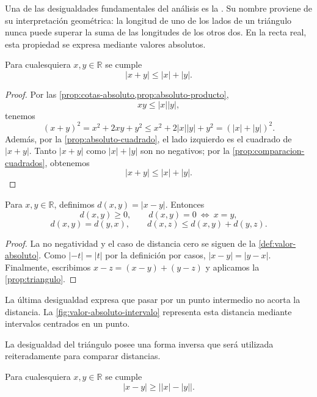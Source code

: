 Una de las desigualdades fundamentales del análisis es la . Su nombre proviene de su interpretación geométrica: la longitud de uno de los lados de un triángulo nunca puede superar la suma de las longitudes de los otros dos. En la recta real, esta propiedad se expresa mediante valores absolutos.

\begin{samepage}
\begin{proposition}
\label{prop:triangulo}
Para cualesquiera $x,y\in\mathbb{R}$ se cumple
\[
|x+y|\leq |x|+|y|.
\]
\end{proposition}
\end{samepage}

\begin{proof}
Por las \cref{prop:cotas-absoluto,prop:absoluto-producto},
\[
xy\leq |x||y|,
\]
tenemos
\[
(x+y)^2=x^2+2xy+y^2
\leq x^2+2|x||y|+y^2
=(|x|+|y|)^2.
\]
Además, por la \cref{prop:absoluto-cuadrado}, el lado izquierdo es el cuadrado de $|x+y|$. Tanto $|x+y|$ como $|x|+|y|$ son no negativos; por la \cref{prop:comparacion-cuadrados}, obtenemos
\[
|x+y|\leq|x|+|y|.
\]
\end{proof}

\begin{samepage}
\begin{proposition}
\label{prop:distancia-real}
Para $x,y\in\mathbb{R}$, definimos $d(x,y)=|x-y|$. Entonces
\[
d(x,y)\geq0,\qquad d(x,y)=0\ \Longleftrightarrow\ x=y,
\]
\[
d(x,y)=d(y,x),\qquad d(x,z)\leq d(x,y)+d(y,z).
\]
\end{proposition}
\end{samepage}

\begin{proof}
La no negatividad y el caso de distancia cero se siguen de la \cref{def:valor-absoluto}. Como $|-t|=|t|$ por la definición por casos, $|x-y|=|y-x|$. Finalmente, escribimos $x-z=(x-y)+(y-z)$ y aplicamos la \cref{prop:triangulo}.
\end{proof}

La última desigualdad expresa que pasar por un punto intermedio no acorta la distancia. La \cref{fig:valor-absoluto-intervalo} representa esta distancia mediante intervalos centrados en un punto.

La desigualdad del triángulo posee una forma inversa que será utilizada reiteradamente para comparar distancias.

\begin{samepage}
\begin{proposition}
\label{prop:triangulo-inversa}
Para cualesquiera $x,y\in\mathbb{R}$ se cumple
\[
|x-y|\geq \bigl||x|-|y|\bigr|.
\]
\end{proposition}
\end{samepage}

